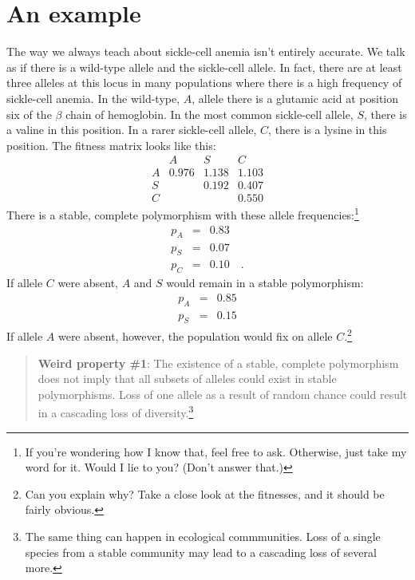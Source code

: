 \section*{An example}

The way we always teach about sickle-cell anemia isn't entirely
accurate. We talk as if there is a wild-type allele and the
sickle-cell allele. In fact, there are at least three alleles at this
locus in many populations where there is a high frequency of
sickle-cell anemia. In the wild-type, $A$, allele there is a glutamic
acid at position six of the $\beta$ chain of hemoglobin. In the most
common sickle-cell allele, $S$, there is a valine in this position. In
a rarer sickle-cell allele, $C$, there is a lysine in this
position. The fitness matrix looks like this:
\[
\begin{array}{cccc}
  & A     & S     & C \\
A & 0.976 & 1.138 & 1.103 \\
S &       & 0.192 & 0.407 \\
C &       &       & 0.550
\end{array}
\]
There is a stable, complete polymorphism with these allele
frequencies:\footnote{If you're wondering how I know that, feel free
  to ask. Otherwise, just take my word for it. Would I lie to you?
  (Don't answer that.)}
\begin{eqnarray*}
p_A &=& 0.83 \\
p_S &=& 0.07 \\
p_C &=& 0.10 \quad .
\end{eqnarray*}
If allele $C$ were absent, $A$ and $S$ would remain in a stable
polymorphism:
\begin{eqnarray*}
p_A &=& 0.85 \\
p_S &=& 0.15
\end{eqnarray*}
If allele $A$ were absent, however, the population would fix on allele
$C$.\footnote{Can you explain why? Take a close look at the fitnesses,
  and it should be fairly obvious.}

\begin{quote} {\bf Weird property \#1}: The existence of a stable,
  complete polymorphism does not imply that all subsets of alleles
  could exist in stable polymorphisms. Loss of one allele as a result
  of random chance could result in a cascading loss of
  diversity.\footnote{The same thing can happen in ecological
    commmunities. Loss of a single species from a stable community may
    lead to a cascading loss of several more.}
\end{quote}

